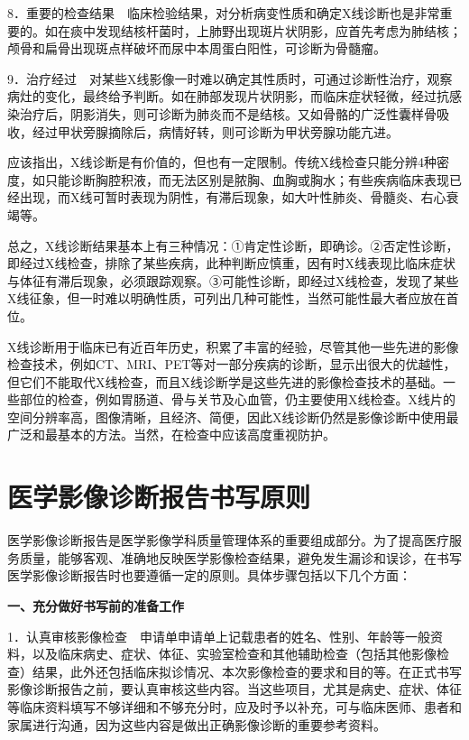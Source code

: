 8．重要的检查结果　临床检验结果，对分析病变性质和确定X线诊断也是非常重要的。如在痰中发现结核杆菌时，上肺野出现斑片状阴影，应首先考虑为肺结核；颅骨和扁骨出现斑点样破坏而尿中本周蛋白阳性，可诊断为骨髓瘤。

9．治疗经过　对某些X线影像一时难以确定其性质时，可通过诊断性治疗，观察病灶的变化，最终给予判断。如在肺部发现片状阴影，而临床症状轻微，经过抗感染治疗后，阴影消失，则可诊断为肺炎而不是结核。又如骨骼的广泛性囊样骨吸收，经过甲状旁腺摘除后，病情好转，则可诊断为甲状旁腺功能亢进。

应该指出，X线诊断是有价值的，但也有一定限制。传统X线检查只能分辨4种密度，如只能诊断胸腔积液，而无法区别是脓胸、血胸或胸水；有些疾病临床表现已经出现，而X线可暂时表现为阴性，有滞后现象，如大叶性肺炎、骨髓炎、右心衰竭等。

总之，X线诊断结果基本上有三种情况：①肯定性诊断，即确诊。②否定性诊断，即经过X线检查，排除了某些疾病，此种判断应慎重，因有时X线表现比临床症状与体征有滞后现象，必须跟踪观察。③可能性诊断，即经过X线检查，发现了某些X线征象，但一时难以明确性质，可列出几种可能性，当然可能性最大者应放在首位。

X线诊断用于临床已有近百年历史，积累了丰富的经验，尽管其他一些先进的影像检查技术，例如CT、MRI、PET等对一部分疾病的诊断，显示出很大的优越性，但它们不能取代X线检查，而且X线诊断学是这些先进的影像检查技术的基础。一些部位的检查，例如胃肠道、骨与关节及心血管，仍主要使用X线检查。X线片的空间分辨率高，图像清晰，且经济、简便，因此X线诊断仍然是影像诊断中使用最广泛和最基本的方法。当然，在检查中应该高度重视防护。

\section{医学影像诊断报告书写原则}

医学影像诊断报告是医学影像学科质量管理体系的重要组成部分。为了提高医疗服务质量，能够客观、准确地反映医学影像检查结果，避免发生漏诊和误诊，在书写医学影像诊断报告时也要遵循一定的原则。具体步骤包括以下几个方面：

\textbf{一、充分做好书写前的准备工作}

1．认真审核影像检查　申请单申请单上记载患者的姓名、性别、年龄等一般资料，以及临床病史、症状、体征、实验室检查和其他辅助检查（包括其他影像检查）结果，此外还包括临床拟诊情况、本次影像检查的要求和目的等。在正式书写影像诊断报告之前，要认真审核这些内容。当这些项目，尤其是病史、症状、体征等临床资料填写不够详细和不够充分时，应及时予以补充，可与临床医师、患者和家属进行沟通，因为这些内容是做出正确影像诊断的重要参考资料。

